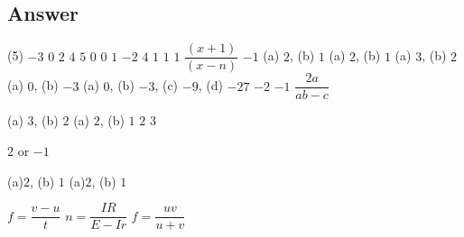         \subsection*{Answer}
        \begin{tasks}[label = \arabic*.,label-width = 1.5em](5)
            \task $-3$
            \task $0$
            \task $2$
            \task $4$
            \task $5$
            \task $0$
            \task $0$
            \task $1$
            \task $-2$
            \task $4$
            \task $1$
            \task $1$
            \task $1$
            \task $\dfrac{(x+1)}{(x-n)}$
            \task $-1$
            \task (a) $2$, (b) $1$
            \task (a) $2$, (b) $1$
            \task (a) $3$, (b) $2$
            \task (a) $0$, (b) $-3$
            \task (a) $0$, (b) $-3$, (c) $-9$, (d) $-27$
            \task $-2$
            \task $-1$
            \task $\dfrac{2a}{ab-c}$



            \task (a) $3$, (b) $2$
            \task (a) $2$, (b) $1$
            \task $2$
            \task $3$
            


            \task $2$ or $-1$


            \task (a)$2$, (b) $1$
            \task (a)$2$, (b) $1$

            \task $f=\dfrac{v-u}{t}$
            \task $n=\dfrac{IR}{E-Ir}$
            \task $f=\dfrac{uv}{u+v}$
        \end{tasks}
